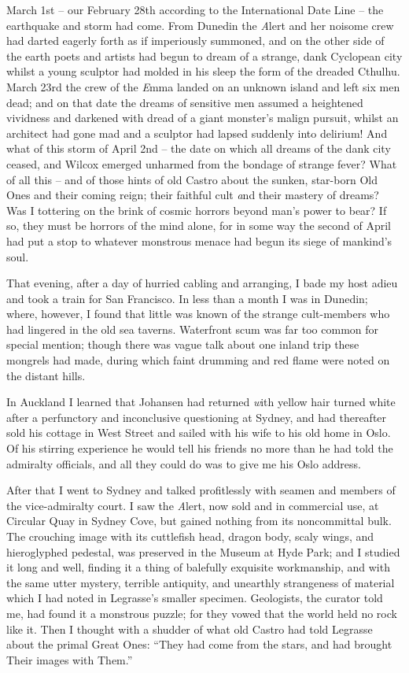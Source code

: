 March 1st⁠ – our February 28th according to the International Date Line⁠ – the earthquake and storm had come. From Dunedin the {\emph Alert} and her noisome crew had darted eagerly forth as if imperiously summoned, and on the other side of the earth poets and artists had begun to dream of a strange, dank Cyclopean city whilst a young sculptor had molded in his sleep the form of the dreaded Cthulhu. March 23rd the crew of the {\emph Emma} landed on an unknown island and left six men dead; and on that date the dreams of sensitive men assumed a heightened vividness and darkened with dread of a giant monster’s malign pursuit, whilst an architect had gone mad and a sculptor had lapsed suddenly into delirium! And what of this storm of April 2nd⁠ – the date on which all dreams of the dank city ceased, and Wilcox emerged unharmed from the bondage of strange fever? What of all this⁠ – and of those hints of old Castro about the sunken, star-born Old Ones and their coming reign; their faithful cult {\emph and their mastery of dreams}? Was I tottering on the brink of cosmic horrors beyond man’s power to bear? If so, they must be horrors of the mind alone, for in some way the second of April had put a stop to whatever monstrous menace had begun its siege of mankind’s soul.

\sectionbreak

That evening, after a day of hurried cabling and arranging, I bade my host adieu and took a train for San Francisco. In less than a month I was in Dunedin; where, however, I found that little was known of the strange cult-members who had lingered in the old sea taverns. Waterfront scum was far too common for special mention; though there was vague talk about one inland trip these mongrels had made, during which faint drumming and red flame were noted on the distant hills.

In Auckland I learned that Johansen had returned {\emph with yellow hair turned white} after a perfunctory and inconclusive questioning at Sydney, and had thereafter sold his cottage in West Street and sailed with his wife to his old home in Oslo. Of his stirring experience he would tell his friends no more than he had told the admiralty officials, and all they could do was to give me his Oslo address.

After that I went to Sydney and talked profitlessly with seamen and members of the vice-admiralty court. I saw the {\emph Alert}, now sold and in commercial use, at Circular Quay in Sydney Cove, but gained nothing from its noncommittal bulk. The crouching image with its cuttlefish head, dragon body, scaly wings, and hieroglyphed pedestal, was preserved in the Museum at Hyde Park; and I studied it long and well, finding it a thing of balefully exquisite workmanship, and with the same utter mystery, terrible antiquity, and unearthly strangeness of material which I had noted in Legrasse’s smaller specimen. Geologists, the curator told me, had found it a monstrous puzzle; for they vowed that the world held no rock like it. Then I thought with a shudder of what old Castro had told Legrasse about the primal Great Ones: “They had come from the stars, and had brought Their images with Them.”

